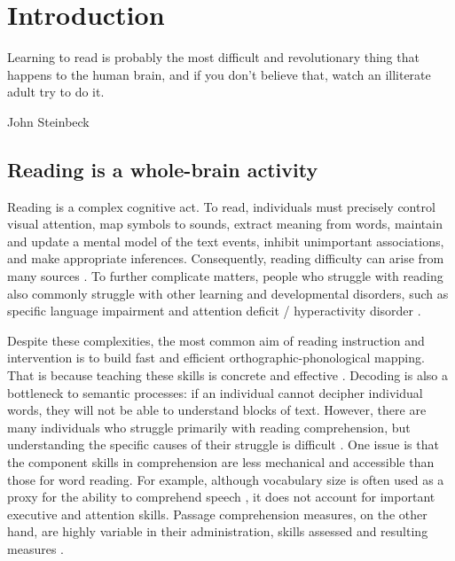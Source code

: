 \chapter{Introduction}

\epigraph{Learning to read is probably the most difficult and revolutionary thing that happens to the human brain, and if you don't believe that, watch an illiterate adult try to do it.}{John Steinbeck}

\section{Reading is a whole-brain activity}
Reading is a complex cognitive act. To read, individuals must precisely control visual attention, map symbols to sounds, extract meaning from words, maintain and update a mental model of the text events, inhibit unimportant associations, and make appropriate inferences. Consequently, reading difficulty can arise from many sources \citep{Pennington2009, vanderLely2010}. To further complicate matters, people who struggle with reading also commonly struggle with other learning and developmental disorders, such as specific language impairment and attention deficit / hyperactivity disorder \citep{Pennington2006, Margari2013}.

Despite these complexities, the most common aim of reading instruction and intervention is to build fast and efficient orthographic-phonological mapping. That is because teaching these skills is concrete and effective \citep{NationalReadingPanel2000}. Decoding is also a bottleneck to semantic processes: if an individual cannot decipher individual words, they will not be able to understand blocks of text. However, there are many individuals who struggle primarily with reading comprehension, but understanding the specific causes of their struggle is difficult \citep{Cain2006}. One issue is that the component skills in comprehension are less mechanical and accessible than those for word reading. For example, although vocabulary size is often used as a proxy for the ability to comprehend speech \citep{Spencer2014}, it does not account for important executive and attention skills. Passage comprehension measures, on the other hand, are highly variable in their administration, skills assessed and resulting measures \citep{Cutting2009a}.

